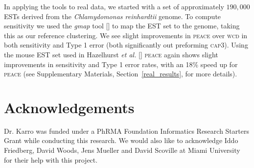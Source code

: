 \documentclass{bioinfo}
\begin{document}
In applying the tools to real data, we started with a set of
approximately $190,000$ ESTs derived from the {\it Chlamydomonas
  reinhardtii} genome.  To compute sensitivity we used the {\it gmap}
tool [\cite{Wu05}] to map the EST set to the genome, taking this as
our reference clustering.  We see slight improvements in
\textsc{peace} over \textsc{wcd} in both sensitivity and Type 1 error
(both significantly out preforming \textsc{cap3}).  Using the mouse EST
set used in Hazelhurst {\it et al.}  [\cite{Hazelhurst08a}]
\textsc{peace} again shows slight improvements in sensitivity and Type
1 error rates, with an 18\% speed up for \textsc{peace} (see
Supplementary Materials, Section~\ref{real_results}, for more
details).

\section{Acknowledgements}

Dr. Karro was funded under a PhRMA Foundation Informatics Research
Starters Grant while conducting this research.  We would also like to
acknowledge Iddo Friedberg, David Woods, Jens Mueller and David
Scoville at Miami University for their help with this project.

\vspace{3mm}


\end{document}

